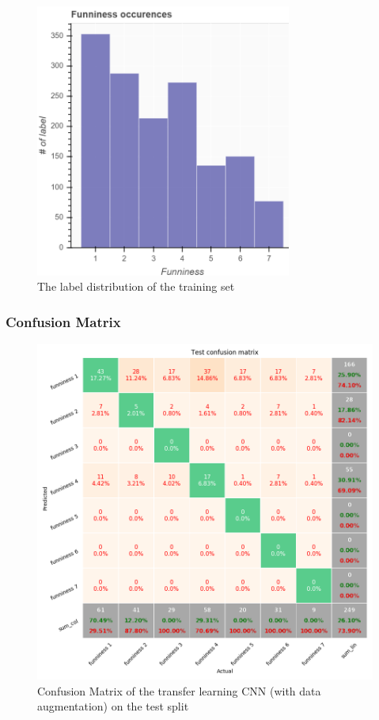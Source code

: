 \documentclass[draft,final,oneside]{vutinfth} %
\begin{document}
\begin{figure}
	\centering
  	\includegraphics[width=0.75\textwidth]{graphics/label_distribution.png}
	\caption{The label distribution of the training set}
	\label{fig:labeldistr}
\end{figure}

\subsubsection{Confusion Matrix}
\begin{figure}
	\centering
  	\includegraphics[width=1.0\textwidth]{graphics/transfer_confusion_test.png}
	\caption{Confusion Matrix of the transfer learning CNN (with data augmentation) on the test split}
	\label{fig:confusionmatrixtransferlearningtest}
\end{figure}
\end{document}
